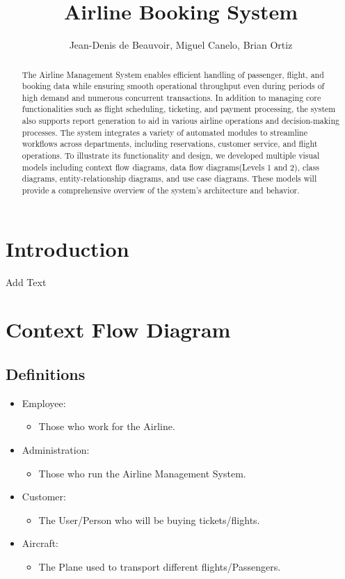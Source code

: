 \documentclass{article}
\title{Airline Booking System}
\author{Jean-Denis de Beauvoir, Miguel Canelo, Brian Ortiz}
\begin{document}
\maketitle

\begin{abstract}
The Airline Management System enables efficient handling of passenger, flight, and booking data while ensuring smooth operational throughput even during periods of high demand and numerous concurrent transactions. In addition to managing core functionalities such as flight scheduling, ticketing, and payment processing, the system also supports report generation to aid in various airline operations and decision-making processes. The system integrates a variety of automated modules to streamline workflows across departments, including reservations, customer service, and flight operations. To illustrate its functionality and design, we developed multiple visual models including context flow diagrams, data flow diagrams(Levels 1 and 2), class diagrams, entity-relationship diagrams, and use case diagrams. These models will provide a comprehensive overview of the system's architecture and behavior.
\end{abstract}

\section{Introduction}

Add Text

\section{Context Flow Diagram}

\subsection{Definitions}

\begin{itemize}
\item Employee:
    \begin{itemize}
    \item Those who work for the Airline.
    \end{itemize}
\item Administration:
    \begin{itemize}
    \item Those who run the Airline Management System.
    \end{itemize}
\item Customer:
    \begin{itemize}
    \item The User/Person who will be buying tickets/flights.
    \end{itemize}
\item Aircraft:
    \begin{itemize}
    \item The Plane used to transport different flights/Passengers.
    \end{itemize}
\end{itemize}
\end{document}
